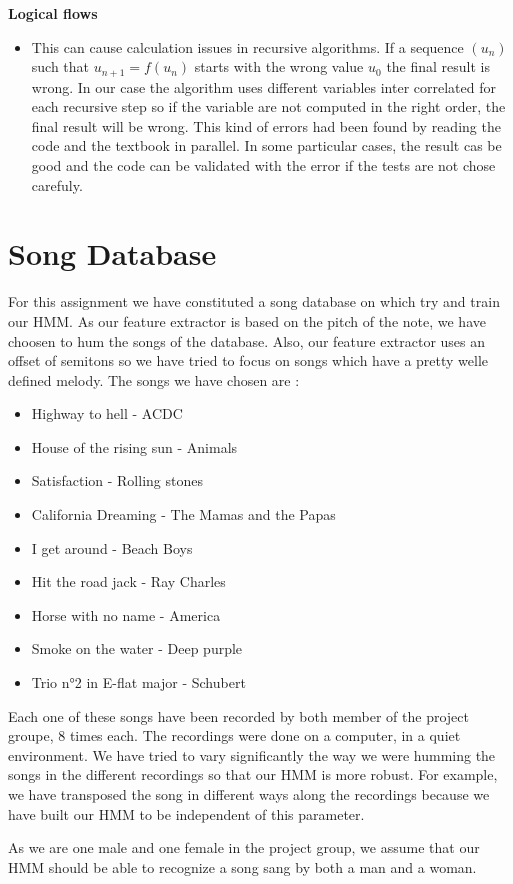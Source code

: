 \documentclass[a4paper]{report}
\newenvironment{pushright}[1]{\textbf{#1}
\begin{itemize}\item[\hspace{12pt}]}{\end{itemize}
}
\begin{document}
\begin{pushright}{Logical flows}
  This can cause calculation issues in recursive algorithms. If a sequence $(u_n)$ such that $ u_{n+1}=f(u_n)$ starts with the wrong value $u_0$ the final result is wrong. In our case the algorithm uses different variables inter correlated for each recursive step so if the variable are not computed in the right order, the final result will be wrong. This kind of errors had been found by reading the code and the textbook in parallel. In some particular cases, the result cas be good and the code can be validated with the error if the tests are not chose carefuly.
\end{pushright}
\section{Song Database}

For this assignment we have constituted a song database on which try and train our HMM.
As our feature extractor is based on the pitch of the note, we have choosen to hum the songs of the database. Also, our feature extractor uses an offset of semitons so we have tried to focus on songs which have a pretty welle defined melody. The songs we have chosen are :

\begin {itemize}
\item Highway to hell - ACDC
\item House of the rising sun - Animals
\item Satisfaction - Rolling stones
\item California Dreaming - The Mamas and the Papas
\item I get around - Beach Boys
\item Hit the road jack - Ray Charles
\item Horse with no name - America
\item Smoke on the water - Deep purple
\item Trio n°2 in E-flat major - Schubert
\end{itemize}

Each one of these songs have been recorded by both member of the project groupe, 8 times each. The recordings were done on a computer, in a quiet environment. We have tried to vary significantly the way we were humming the songs in the different recordings so that our HMM is more robust. For example, we have transposed the song in different ways along the recordings because we have built our HMM to be independent of this parameter.

As we are one male and one female in the project group, we assume that our HMM should be able to recognize a song sang by both a man and a woman.
\end{document}
